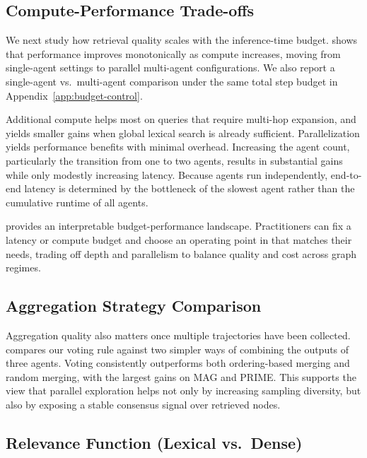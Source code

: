 \subsection{Compute-Performance Trade-offs}
\label{sec:cost-performance}

We next study how retrieval quality scales with the inference-time budget.  shows that performance improves monotonically as compute increases, moving from single-agent settings to parallel multi-agent configurations. We also report a single-agent vs.~multi-agent comparison under the same total step budget in Appendix~\ref{app:budget-control}. 

Additional compute helps most on queries that require multi-hop expansion, and yields smaller gains when global lexical search is already sufficient.  Parallelization yields performance benefits with minimal overhead. Increasing the agent count, particularly the transition from one to two agents, results in substantial gains while only modestly increasing latency. Because agents run independently, end-to-end latency is determined by the bottleneck of the slowest agent rather than the cumulative runtime of all agents.

\retrieverShort provides an interpretable budget-performance landscape. Practitioners can fix a latency or compute budget and choose an operating point in  that matches their needs, trading off depth and parallelism to balance quality and cost across graph regimes. 

\subsection{Aggregation Strategy Comparison}
\label{sec:aggregation-strategy}

\TabAggregationComparison[h]

Aggregation quality also matters once multiple trajectories have been collected.  compares our voting rule against two simpler ways of combining the outputs of three agents. Voting consistently outperforms both ordering-based merging and random merging, with the largest gains on MAG and PRIME. This supports the view that parallel exploration helps not only by increasing sampling diversity, but also by exposing a stable consensus signal over retrieved nodes. 

\subsection{Relevance Function (Lexical vs.\ Dense)}
\label{sec:relevance-lexical-dense}
\TabDenseRetrieverAblation[h]

